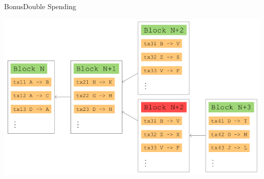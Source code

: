 \documentclass[xcolor=dvipsnames]{beamer}
\begin{document}
\begin{frame}{Bonus}{Double Spending}
\begin{center}
\includegraphics[scale=.4]{double-spending.png} 
\end{center}

\end{frame}
\end{document}
